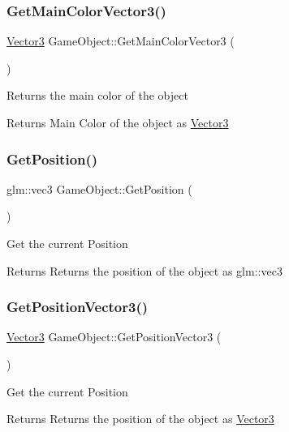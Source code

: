 \subsubsection{\texorpdfstring{GetMainColorVector3()}{GetMainColorVector3()}}
{\footnotesize\ttfamily \mbox{\hyperlink{struct_vector3}{Vector3}} Game\+Object\+::\+Get\+Main\+Color\+Vector3 (\begin{DoxyParamCaption}{ }\end{DoxyParamCaption})}

Returns the main color of the object \begin{DoxyReturn}{Returns}
Main Color of the object as \mbox{\hyperlink{struct_vector3}{Vector3}} 
\end{DoxyReturn}
\mbox{\label{class_game_object_a345efa82c1b4d5f41100f267ee859dae}} 
\subsubsection{\texorpdfstring{GetPosition()}{GetPosition()}}
{\footnotesize\ttfamily glm\+::vec3 Game\+Object\+::\+Get\+Position (\begin{DoxyParamCaption}{ }\end{DoxyParamCaption})}

Get the current Position \begin{DoxyReturn}{Returns}
Returns the position of the object as glm\+::vec3 
\end{DoxyReturn}
\mbox{\label{class_game_object_a4541e1e1f7461f91878e7ddc1a145d89}} 
\subsubsection{\texorpdfstring{GetPositionVector3()}{GetPositionVector3()}}
{\footnotesize\ttfamily \mbox{\hyperlink{struct_vector3}{Vector3}} Game\+Object\+::\+Get\+Position\+Vector3 (\begin{DoxyParamCaption}{ }\end{DoxyParamCaption})}

Get the current Position \begin{DoxyReturn}{Returns}
Returns the position of the object as \mbox{\hyperlink{struct_vector3}{Vector3}} 
\end{DoxyReturn}
\mbox{\label{class_game_object_a1da6cee9bfe225ab39e58b2227faba6a}} 
